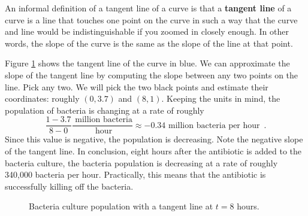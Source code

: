 An informal definition of a tangent line of a curve is that a {\bf tangent line} of a curve is a line that touches one point on the curve in such a way that the curve and line would be indistinguishable if you zoomed in closely enough. In other words, the slope of the curve is the same as the slope of the line at that point.

\begin{solution}
Figure \ref{fig:2-2-bacteria-tangent} shows the tangent line of the curve in blue. We can approximate the slope of the tangent line by computing the slope between any two points on the line. Pick any two. We will pick the two black points and estimate their coordinates: roughly $(0, 3.7)$ and $(8, 1)$. Keeping the units in mind, the population of bacteria is changing at a rate of roughly
$$\frac{1-3.7}{8-0} \frac{\mbox{ million bacteria}}{\mbox{ hour}} \approx -0.34 \mbox{ million bacteria per hour} \enspace .$$
Since this value is negative, the population is decreasing. Note the negative slope of the tangent line. In conclusion, eight hours after the antibiotic is added to the bacteria culture, the bacteria population is decreasing at a rate of roughly 340,000 bacteria per hour. Practically, this means that the antibiotic is successfully killing off the bacteria.
\end{solution}
\begin{figure}[ht!]
\centering
{}
\caption{Bacteria culture population with a tangent line at $t=8$ hours.}
\label{fig:2-2-bacteria-tangent}
\end{figure}



